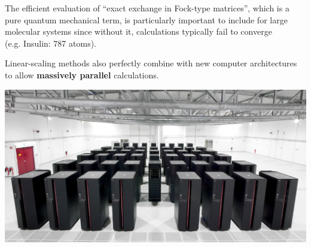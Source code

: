 \documentclass[portrait,kjemiDim,fontscale=0.292]{baposter}
\begin{document}
\begin{poster}
{%



The efficient evaluation of ``exact exchange in Fock-type matrices'', which is a pure quantum mechanical term, is particularly important to include for large molecular systems since without it, calculations typically fail to converge \\
(e.g. Insulin: 787 atoms).


Linear-scaling methods also perfectly combine with new computer architectures to allow  \textbf{massively parallel} calculations.

\hspace{5em}
 \includegraphics[width=0.7\linewidth]{ibm_supercomputer.png}



   }




     

\end{poster}
\end{document}
